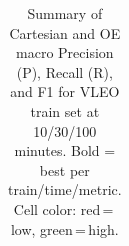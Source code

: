 \begin{table}[t]
{\begin{tabular}{l ccc ccc ccc ccc ccc ccc}
\bottomrule
\end{tabular}%
}
\caption{Summary of Cartesian and OE macro Precision (P), Recall (R), and F1 for VLEO train set at 10/30/100 minutes. Bold = best per train/time/metric. Cell color: red\,=\,low, green\,=\,high.}
\label{tab:class_vleo_feat}
\end{table}
